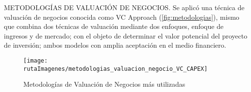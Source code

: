 \textcolor{secundario}{METODOLOG\'IAS DE VALUACI\'ON DE NEGOCIOS}. Se aplic\'o una t\'ecnica de valuaci\'on de negocios conocida como \textcolor{principal}{VC Approach} (\autoref{fig:metodologias}), mismo que combina dos t\'ecnicas de valuaci\'on mediante dos enfoques, enfoque de ingresos y de mercado; con el objeto de determinar el valor potencial del proyecto de inversi\'on; ambos modelos con amplia aceptaci\'on en el medio financiero.

\begin{figure}[H]
\centering
\caption{Metodolog\'ias de Valuaci\'on de Negocios m\'as utilizadas\label{fig:metodologias}}
\texttt{[image: \\rutaImagenes/metodologias\_valuacion\_negocio\_VC\_CAPEX]}\\

\end{figure}
